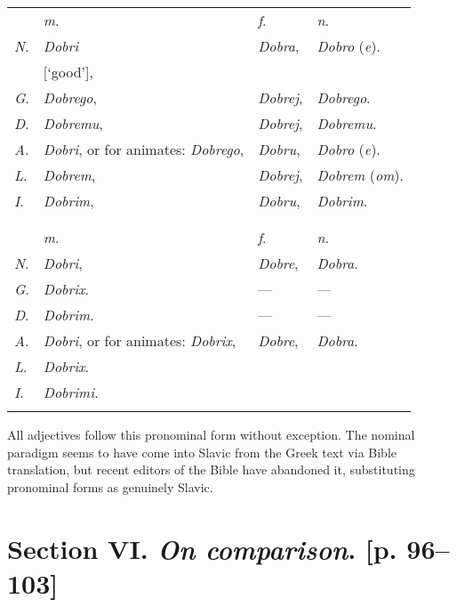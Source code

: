 \begin{longtable}{ l l l l }    
    \lsptoprule
    \multicolumn{4}{ c }{Singular.} \\
    \midrule
    & \textit{m}. & \textit{f}. & \textit{n}. \\
    \textit{N}. & \textit{Dobri} & \textit{Dobra}, & \textit{Dobro} (\textit{e}). \\
    & [‘good’], & & \\
    \textit{G}. & \textit{Dobrego}, & \textit{Dobrej}, & \textit{Dobrego}. \\
    \textit{D}. & \textit{Dobremu}, & \textit{Dobrej}, & \textit{Dobremu}. \\
    \textit{A}. & \textit{Dobri}, or for animates: \textit{Dobrego}, & \textit{Dobru}, & \textit{Dobro} (\textit{e}). \\
    \textit{L}. & \textit{Dobrem}, & \textit{Dobrej}, & \textit{Dobrem} (\textit{om}). \\
    \textit{I}. & \textit{Dobrim}, & \textit{Dobru}, & \textit{Dobrim}. \\
    \lspbottomrule
    \\
    \lsptoprule
    \multicolumn{4}{ c }{[96] Plural.} \\
    \midrule
    & \textit{m}. & \textit{f}. & \textit{n}. \\
    \textit{N}. & \textit{Dobri}, & \textit{Dobre}, & \textit{Dobra}. \\
    \textit{G}. & \textit{Dobrix}. & — & — \\
    \textit{D}. & \textit{Dobrim}. & — & — \\
    \textit{A}. & \textit{Dobri}, or for animates: \textit{Dobrix}, & \textit{Dobre}, & \textit{Dobra}. \\
    \textit{L}. & \textit{Dobrix}. & & \\
    \textit{I}. & \textit{Dobrimi}. &  & \\
    \lspbottomrule
\end{longtable}

All adjectives follow this pronominal form without exception. The nominal paradigm seems to have come into Slavic from the Greek text via Bible translation, but recent editors of the Bible have abandoned it, substituting pronominal forms as genuinely Slavic.

\section*{Section VI. \textit{On comparison}. [p. 96--103]}

